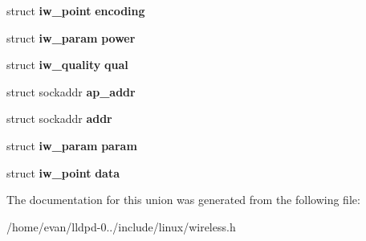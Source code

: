 \begin{DoxyCompactItemize}
\item 
struct {\bf iw\-\_\-point} {\bfseries encoding}\label{unioniwreq__data_a28f31a78a4baa68da37c25878f567d46}

\item 
struct {\bf iw\-\_\-param} {\bfseries power}\label{unioniwreq__data_a2325258dda77ca07e2cbc9ef409bf9da}

\item 
struct {\bf iw\-\_\-quality} {\bfseries qual}\label{unioniwreq__data_a7e12691da450e02fbae12365d41697ba}

\item 
struct sockaddr {\bfseries ap\-\_\-addr}\label{unioniwreq__data_a19dceb15520a9c32c25b6b1144d97452}

\item 
struct sockaddr {\bfseries addr}\label{unioniwreq__data_a979fbf6cbda14801a80be566a480f4ad}

\item 
struct {\bf iw\-\_\-param} {\bfseries param}\label{unioniwreq__data_acf44a9c6afe426de087bbec7a13e90f5}

\item 
struct {\bf iw\-\_\-point} {\bfseries data}\label{unioniwreq__data_a2ddc5fe65bda729a0e9bfa702778c230}

\end{DoxyCompactItemize}


\-The documentation for this union was generated from the following file\-:\begin{DoxyCompactItemize}
\item 
/home/evan/lldpd-\/0../include/linux/wireless.\-h\end{DoxyCompactItemize}
